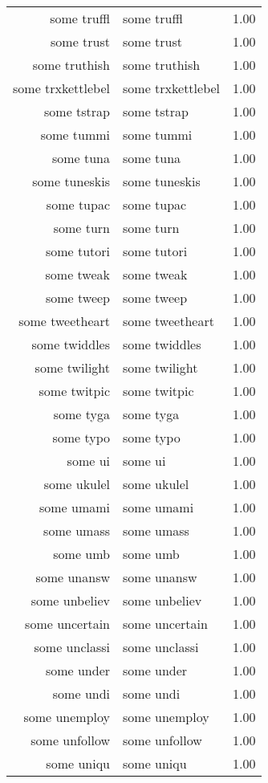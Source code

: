 \begin{table}[ht]
\begin{tabular}{rlr}
  some truffl & some truffl & 1.00 \\ 
  some trust & some trust & 1.00 \\ 
  some truthish & some truthish & 1.00 \\ 
  some trxkettlebel & some trxkettlebel & 1.00 \\ 
  some tstrap & some tstrap & 1.00 \\ 
  some tummi & some tummi & 1.00 \\ 
  some tuna & some tuna & 1.00 \\ 
  some tuneskis & some tuneskis & 1.00 \\ 
  some tupac & some tupac & 1.00 \\ 
  some turn & some turn & 1.00 \\ 
  some tutori & some tutori & 1.00 \\ 
  some tweak & some tweak & 1.00 \\ 
  some tweep & some tweep & 1.00 \\ 
  some tweetheart & some tweetheart & 1.00 \\ 
  some twiddles & some twiddles & 1.00 \\ 
  some twilight & some twilight & 1.00 \\ 
  some twitpic & some twitpic & 1.00 \\ 
  some tyga & some tyga & 1.00 \\ 
  some typo & some typo & 1.00 \\ 
  some ui & some ui & 1.00 \\ 
  some ukulel & some ukulel & 1.00 \\ 
  some umami & some umami & 1.00 \\ 
  some umass & some umass & 1.00 \\ 
  some umb & some umb & 1.00 \\ 
  some unansw & some unansw & 1.00 \\ 
  some unbeliev & some unbeliev & 1.00 \\ 
  some uncertain & some uncertain & 1.00 \\ 
  some unclassi & some unclassi & 1.00 \\ 
  some under & some under & 1.00 \\ 
  some undi & some undi & 1.00 \\ 
  some unemploy & some unemploy & 1.00 \\ 
  some unfollow & some unfollow & 1.00 \\ 
  some uniqu & some uniqu & 1.00 \\ 

\end{tabular}
\end{table}
